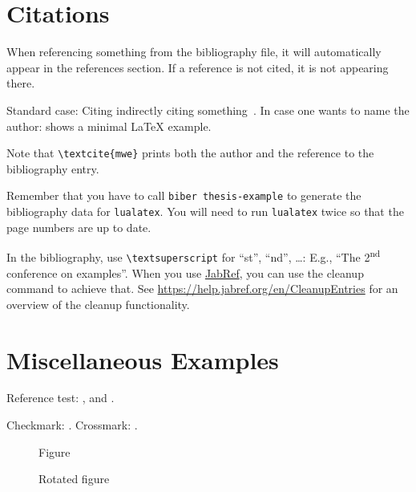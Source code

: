 \section{Citations}

When referencing something from the bibliography file, it will automatically appear in the references section.
If a reference is not cited, it is not appearing there.

\begin{ltgexample}
Standard case: Citing indirectly citing something~\cite{mwe}.
In case one wants to name the author: \textcite{mwe} shows a minimal \LaTeX{} example.
\end{ltgexample}

Note that \texttt{\textbackslash textcite\{mwe\}} prints both the author and the reference to the bibliography entry.

Remember that you have to call \texttt{biber thesis-example} to generate the bibliography data for \texttt{lualatex}.
You will need to run \texttt{lualatex} twice so that the page numbers are up to date.


In the bibliography, use \texttt{\textbackslash textsuperscript} for \enquote{st}, \enquote{nd}, \ldots:
E.g., \enquote{The 2\textsuperscript{nd} conference on examples}.
When you use \href{https://www.jabref.org}{JabRef}, you can use the cleanup command to achieve that.
See \url{https://help.jabref.org/en/CleanupEntries} for an overview of the cleanup functionality.

\section{Miscellaneous Examples}
\label{ssec:example}

Reference test: ,  and .

\begin{ltgexample}
Checkmark: \dingcheck.
Crossmark: \dingcross.
\end{ltgexample}

\begin{figure}
  \missingfigure{}
  \caption{Figure}
  \label{fig:Abbildung}
\end{figure}

\begin{landscape}
  \begin{figure}
    \missingfigure{}
    \caption{Rotated figure}
    \label{fig:AbbildungGedreht}
  \end{figure}
\end{landscape}

